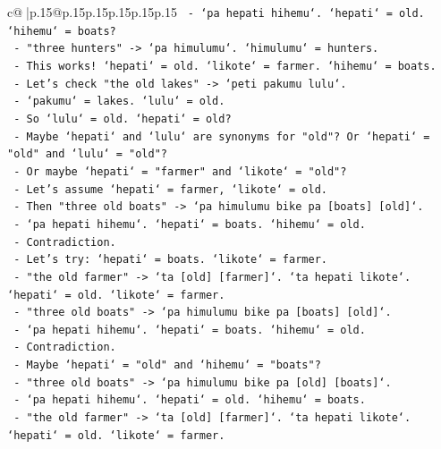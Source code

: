 \documentclass{article}
\begin{document}
{\begin{supertabular}{c@{$\;$}|p{.15\linewidth}@{}p{.15\linewidth}p{.15\linewidth}p{.15\linewidth}p{.15\linewidth}p{.15\linewidth}}
{{{\texttt{                {-} `pa hepati hihemu`. `hepati` = old. `hihemu` = boats?} \\
\texttt{                {-} "three hunters" {-}> `pa himulumu`. `himulumu` = hunters.} \\
\texttt{                {-} This works! `hepati` = old. `likote` = farmer. `hihemu` = boats.} \\
\texttt{                {-} Let's check "the old lakes" {-}> `peti pakumu lulu`.} \\
\texttt{                {-} `pakumu` = lakes. `lulu` = old.} \\
\texttt{                {-} So `lulu` = old. `hepati` = old?} \\
\texttt{                {-} Maybe `hepati` and `lulu` are synonyms for "old"? Or `hepati` = "old" and `lulu` = "old"?} \\
\texttt{                {-} Or maybe `hepati` = "farmer" and `likote` = "old"?} \\
\texttt{                {-} Let's assume `hepati` = farmer, `likote` = old.} \\
\texttt{                {-} Then "three old boats" {-}> `pa himulumu bike pa {[}boats{]} {[}old{]}`.} \\
\texttt{                {-} `pa hepati hihemu`. `hepati` = boats. `hihemu` = old.} \\
\texttt{                {-} Contradiction.} \\
\texttt{                {-} Let's try: `hepati` = boats. `likote` = farmer.} \\
\texttt{                {-} "the old farmer" {-}> `ta {[}old{]} {[}farmer{]}`. `ta hepati likote`. `hepati` = old. `likote` = farmer.} \\
\texttt{                {-} "three old boats" {-}> `pa himulumu bike pa {[}boats{]} {[}old{]}`.} \\
\texttt{                {-} `pa hepati hihemu`. `hepati` = boats. `hihemu` = old.} \\
\texttt{                {-} Contradiction.} \\
\texttt{                {-} Maybe `hepati` = "old" and `hihemu` = "boats"?} \\
\texttt{                {-} "three old boats" {-}> `pa himulumu bike pa {[}old{]} {[}boats{]}`.} \\
\texttt{                {-} `pa hepati hihemu`. `hepati` = old. `hihemu` = boats.} \\
\texttt{                {-} "the old farmer" {-}> `ta {[}old{]} {[}farmer{]}`. `ta hepati likote`. `hepati` = old. `likote` = farmer.} \\
}}}
\end{supertabular}}
\end{document}
